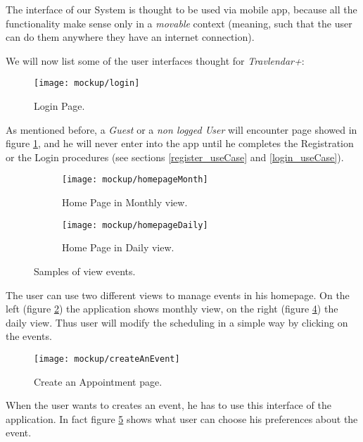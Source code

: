The interface of our System is thought to be used via mobile app, because all the functionality make sense only in a \textit{movable} context (meaning, such that the user can do them anywhere they have an internet connection).

We will now list some of the user interfaces thought for \textit{Travlendar+}:

\begin{figure}[h]
	\texttt{[image: mockup/login]}
	\centering
	\caption{Login Page.}
	\label{fig:login}
\end{figure}
As mentioned before, a \textit{Guest} or a \textit{non logged User} will encounter page showed in figure \ref{fig:login}, and he will never enter into the app until he completes the Registration or the Login procedures (see sections \ref{register_useCase} and \ref{login_useCase}).

\begin{figure}[H]
	\begin{subfigure}{0.5\textwidth}
		\texttt{[image: mockup/homepageMonth]} 
		\centering
		\caption{Home Page in Monthly view.}
		\label{fig:homePage_Month}
	\end{subfigure}
	\begin{subfigure}{0.5\textwidth}
		\texttt{[image: mockup/homepageDaily]} 
		\centering
		\caption{Home Page in Daily view.}
		\label{fig:homePage_Day}
	\end{subfigure}
	\caption{Samples of view events.}
\end{figure}

The user can use two different views to manage events in his homepage. On the left (figure \ref{fig:homePage_Month}) the application shows monthly view, on the right (figure \ref{fig:homePage_Day}) the daily view. Thus user will modify the scheduling in a simple way by clicking on the events.

\begin{figure}[H]
	\texttt{[image: mockup/createAnEvent]}
	\centering
	\caption{Create an Appointment page.}
	\label{fig:createEvent}
\end{figure}
When the user wants to creates an event, he has to use this interface of the application. In fact figure \ref{fig:createEvent} shows what user can choose his preferences about the event.


